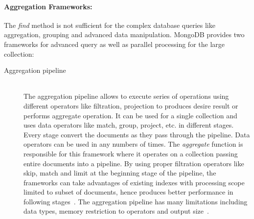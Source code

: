 \paragraph{Aggregation Frameworks:}
 The \textit{find} method is not sufficient for the complex database queries like aggregation, grouping  and advanced data manipulation. MongoDB provides two frameworks for advanced query as well as parallel processing for the large collection:
 \begin{description}
		\item[Aggregation pipeline]  \hfill \\
		The aggregation pipeline allows to execute series of operations using different operators like filtration, projection to produces desire result or performs aggregate operation.  It can be used for a single collection and uses  data operators like match, group, project, etc. in different stages. Every stage convert the documents as they pass through the pipeline. Data operators can be used  in any numbers of times.  The \textit{aggregate} function is responsible for this framework where it operates on a collection passing  entire documents into a pipeline. By using proper filtration operators like  skip, match and limit at the beginning  stage of the pipeline,  the frameworks can take advantages of existing indexes with processing scope limited to subset of documents, hence produces better performance in following stages~\cite{mongodbaggregation}. The aggregation pipeline has many limitations including data types, memory restriction to operators and output size~\cite{nosql/comparision}. 
		

\end{description}
